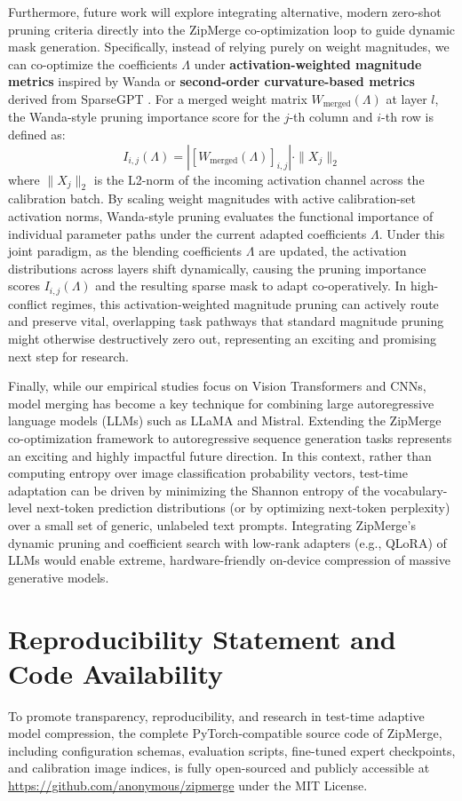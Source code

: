 Furthermore, future work will explore integrating alternative, modern zero-shot pruning criteria directly into the ZipMerge co-optimization loop to guide dynamic mask generation. Specifically, instead of relying purely on weight magnitudes, we can co-optimize the coefficients $\Lambda$ under \textbf{activation-weighted magnitude metrics} inspired by Wanda \cite{sun2023wanda} or \textbf{second-order curvature-based metrics} derived from SparseGPT \cite{frantar2023sparsegpt}. For a merged weight matrix $W_{\text{merged}}(\Lambda)$ at layer $l$, the Wanda-style pruning importance score for the $j$-th column and $i$-th row is defined as:
\begin{equation}
    I_{i, j}(\Lambda) = |[W_{\text{merged}}(\Lambda)]_{i, j}| \cdot \|X_j\|_2
\end{equation}
where $\|X_j\|_2$ is the L2-norm of the incoming activation channel across the calibration batch. By scaling weight magnitudes with active calibration-set activation norms, Wanda-style pruning evaluates the functional importance of individual parameter paths under the current adapted coefficients $\Lambda$. Under this joint paradigm, as the blending coefficients $\Lambda$ are updated, the activation distributions across layers shift dynamically, causing the pruning importance scores $I_{i, j}(\Lambda)$ and the resulting sparse mask to adapt co-operatively. In high-conflict regimes, this activation-weighted magnitude pruning can actively route and preserve vital, overlapping task pathways that standard magnitude pruning might otherwise destructively zero out, representing an exciting and promising next step for research.

Finally, while our empirical studies focus on Vision Transformers and CNNs, model merging has become a key technique for combining large autoregressive language models (LLMs) such as LLaMA and Mistral. Extending the ZipMerge co-optimization framework to autoregressive sequence generation tasks represents an exciting and highly impactful future direction. In this context, rather than computing entropy over image classification probability vectors, test-time adaptation can be driven by minimizing the Shannon entropy of the vocabulary-level next-token prediction distributions (or by optimizing next-token perplexity) over a small set of generic, unlabeled text prompts. Integrating ZipMerge's dynamic pruning and coefficient search with low-rank adapters (e.g., QLoRA) of LLMs would enable extreme, hardware-friendly on-device compression of massive generative models.

\section*{Reproducibility Statement and Code Availability}
To promote transparency, reproducibility, and research in test-time adaptive model compression, the complete PyTorch-compatible source code of ZipMerge, including configuration schemas, evaluation scripts, fine-tuned expert checkpoints, and calibration image indices, is fully open-sourced and publicly accessible at \url{https://github.com/anonymous/zipmerge} under the MIT License.
